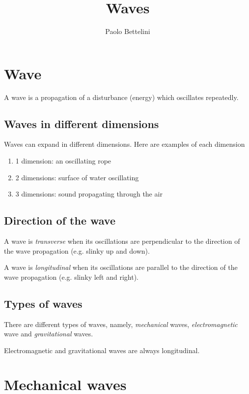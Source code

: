 \documentclass[a4paper]{article}
\title{Waves}
\author{Paolo Bettelini}
\date{}
\begin{document}
\maketitle

\tableofcontents

\pagebreak

\section{Wave}

A wave is a propagation of a disturbance (energy) which oscillates
repeatedly.

\subsection{Waves in different dimensions}

Waves can expand in different dimensions. Here are examples of each dimension
\begin{enumerate}
    \item 1 dimension: an oscillating rope
    \item 2 dimensions: surface of water oscillating
    \item 3 dimensions: sound propagating through the air
\end{enumerate}

\subsection{Direction of the wave}

A wave is \textit{transverse} when its oscillations are perpendicular
to the direction of the wave propagation (e.g. slinky up and down).

A wave is \textit{longitudinal} when its oscillations are parallel
to the direction of the wave propagation (e.g. slinky left and right).

\subsection{Types of waves}

There are different types of waves, namely,
\textit{mechanical} waves, \textit{electromagnetic} wave
and \textit{gravitational} waves.

Electromagnetic and gravitational waves are always longitudinal.

\section{Mechanical waves}
\end{document}
